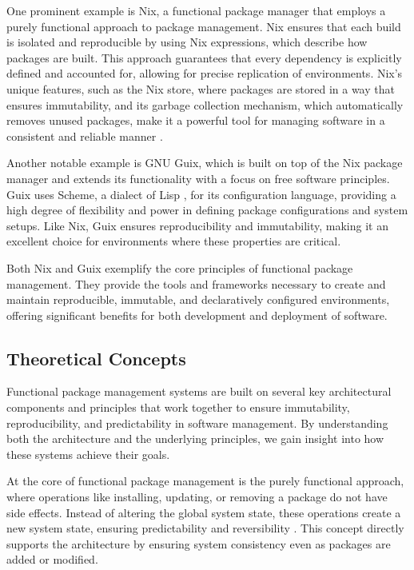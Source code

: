 One prominent example is Nix, a functional package manager that employs a purely
functional approach to package management. Nix ensures that each build is isolated
and reproducible by using Nix expressions, which describe how packages are built.
This approach guarantees that every dependency is explicitly defined and accounted for,
allowing for precise replication of environments. Nix's unique features, such as the
Nix store, where packages are stored in a way that ensures immutability, and its garbage
collection mechanism, which automatically removes unused packages, make it a powerful
tool for managing software in a consistent and reliable manner
\cite[Section 2.2]{courtesFunctionalPackageManagement2013}.

Another notable example is GNU Guix, which is built on top of the Nix package manager
\cite{AcknowledgmentsGNUGuix} and extends its functionality with a focus on free
software principles. Guix uses Scheme, a dialect of Lisp \cite{LispProgrammingLanguage2024},
for its configuration language, providing a high degree of flexibility and power in
defining package configurations and system setups. Like Nix, Guix ensures reproducibility
and immutability, making it an excellent choice for environments where these properties
are critical.

Both Nix and Guix exemplify the core principles of functional package management.
They provide the tools and frameworks necessary to create and maintain reproducible,
immutable, and declaratively configured environments, offering significant benefits
for both development and deployment of software.

\subsection{Theoretical Concepts}

Functional package management systems are built on several key architectural components
and principles that work together to ensure immutability, reproducibility, and predictability
in software management. By understanding both the architecture and the underlying principles,
we gain insight into how these systems achieve their goals.

At the core of functional package management is the purely functional approach, where operations
like installing, updating, or removing a package do not have side effects. Instead of altering
the global system state, these operations create a new system state, ensuring predictability
and reversibility \cite[Section 2.1]{courtesFunctionalPackageManagement2013}. This concept
directly supports the architecture by ensuring system consistency even as packages are added
or modified.

